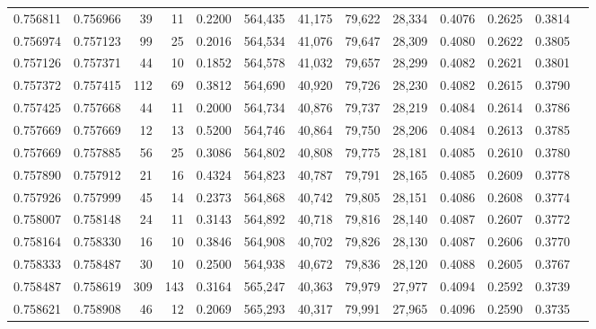 \begin{tabular}{rrrrrrrrrrrrr}
0.756811 & 0.756966 &    39 &  11 &                                     0.2200 & 564,435 &  41,175 &  79,622 &  28,334 & 0.4076 & 0.2625 & 0.3814 \\
0.756974 & 0.757123 &    99 &  25 &                                     0.2016 & 564,534 &  41,076 &  79,647 &  28,309 & 0.4080 & 0.2622 & 0.3805 \\
0.757126 & 0.757371 &    44 &  10 &                                     0.1852 & 564,578 &  41,032 &  79,657 &  28,299 & 0.4082 & 0.2621 & 0.3801 \\
0.757372 & 0.757415 &   112 &  69 &                                     0.3812 & 564,690 &  40,920 &  79,726 &  28,230 & 0.4082 & 0.2615 & 0.3790 \\
0.757425 & 0.757668 &    44 &  11 &                                     0.2000 & 564,734 &  40,876 &  79,737 &  28,219 & 0.4084 & 0.2614 & 0.3786 \\
0.757669 & 0.757669 &    12 &  13 &                                     0.5200 & 564,746 &  40,864 &  79,750 &  28,206 & 0.4084 & 0.2613 & 0.3785 \\
0.757669 & 0.757885 &    56 &  25 &                                     0.3086 & 564,802 &  40,808 &  79,775 &  28,181 & 0.4085 & 0.2610 & 0.3780 \\
0.757890 & 0.757912 &    21 &  16 &                                     0.4324 & 564,823 &  40,787 &  79,791 &  28,165 & 0.4085 & 0.2609 & 0.3778 \\
0.757926 & 0.757999 &    45 &  14 &                                     0.2373 & 564,868 &  40,742 &  79,805 &  28,151 & 0.4086 & 0.2608 & 0.3774 \\
0.758007 & 0.758148 &    24 &  11 &                                     0.3143 & 564,892 &  40,718 &  79,816 &  28,140 & 0.4087 & 0.2607 & 0.3772 \\
0.758164 & 0.758330 &    16 &  10 &                                     0.3846 & 564,908 &  40,702 &  79,826 &  28,130 & 0.4087 & 0.2606 & 0.3770 \\
0.758333 & 0.758487 &    30 &  10 &                                     0.2500 & 564,938 &  40,672 &  79,836 &  28,120 & 0.4088 & 0.2605 & 0.3767 \\
0.758487 & 0.758619 &   309 & 143 &                                     0.3164 & 565,247 &  40,363 &  79,979 &  27,977 & 0.4094 & 0.2592 & 0.3739 \\
0.758621 & 0.758908 &    46 &  12 &                                     0.2069 & 565,293 &  40,317 &  79,991 &  27,965 & 0.4096 & 0.2590 & 0.3735 \\

\end{tabular}
